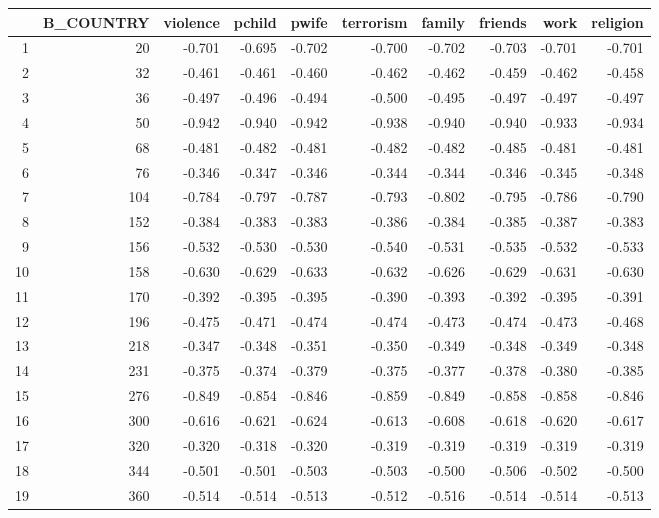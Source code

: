 \documentclass{amsart}
\begin{document}
\begin{longtable}{rrrrrrrrrr}
  \hline
 & B\_COUNTRY & violence & pchild & pwife & terrorism & family & friends & work & religion \\ 
  \hline
1 & 20 & -0.701 & -0.695 & -0.702 & -0.700 & -0.702 & -0.703 & -0.701 & -0.701 \\ 
  2 & 32 & -0.461 & -0.461 & -0.460 & -0.462 & -0.462 & -0.459 & -0.462 & -0.458 \\ 
  3 & 36 & -0.497 & -0.496 & -0.494 & -0.500 & -0.495 & -0.497 & -0.497 & -0.497 \\ 
  4 & 50 & -0.942 & -0.940 & -0.942 & -0.938 & -0.940 & -0.940 & -0.933 & -0.934 \\ 
  5 & 68 & -0.481 & -0.482 & -0.481 & -0.482 & -0.482 & -0.485 & -0.481 & -0.481 \\ 
  6 & 76 & -0.346 & -0.347 & -0.346 & -0.344 & -0.344 & -0.346 & -0.345 & -0.348 \\ 
  7 & 104 & -0.784 & -0.797 & -0.787 & -0.793 & -0.802 & -0.795 & -0.786 & -0.790 \\ 
  8 & 152 & -0.384 & -0.383 & -0.383 & -0.386 & -0.384 & -0.385 & -0.387 & -0.383 \\ 
  9 & 156 & -0.532 & -0.530 & -0.530 & -0.540 & -0.531 & -0.535 & -0.532 & -0.533 \\ 
  10 & 158 & -0.630 & -0.629 & -0.633 & -0.632 & -0.626 & -0.629 & -0.631 & -0.630 \\ 
  11 & 170 & -0.392 & -0.395 & -0.395 & -0.390 & -0.393 & -0.392 & -0.395 & -0.391 \\ 
  12 & 196 & -0.475 & -0.471 & -0.474 & -0.474 & -0.473 & -0.474 & -0.473 & -0.468 \\ 
  13 & 218 & -0.347 & -0.348 & -0.351 & -0.350 & -0.349 & -0.348 & -0.349 & -0.348 \\ 
  14 & 231 & -0.375 & -0.374 & -0.379 & -0.375 & -0.377 & -0.378 & -0.380 & -0.385 \\ 
  15 & 276 & -0.849 & -0.854 & -0.846 & -0.859 & -0.849 & -0.858 & -0.858 & -0.846 \\ 
  16 & 300 & -0.616 & -0.621 & -0.624 & -0.613 & -0.608 & -0.618 & -0.620 & -0.617 \\ 
  17 & 320 & -0.320 & -0.318 & -0.320 & -0.319 & -0.319 & -0.319 & -0.319 & -0.319 \\ 
  18 & 344 & -0.501 & -0.501 & -0.503 & -0.503 & -0.500 & -0.506 & -0.502 & -0.500 \\ 
  19 & 360 & -0.514 & -0.514 & -0.513 & -0.512 & -0.516 & -0.514 & -0.514 & -0.513 \\ 

\end{longtable}
\end{document}
